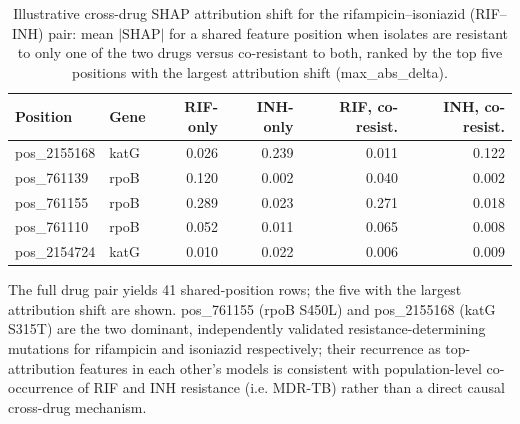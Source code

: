 \begin{table}[t]
\centering
\caption{Illustrative cross-drug SHAP attribution shift for the rifampicin--isoniazid (RIF--INH) pair: mean $|\mathrm{SHAP}|$ for a shared feature position when isolates are resistant to only one of the two drugs versus co-resistant to both, ranked by the top five positions with the largest attribution shift (max\_abs\_delta).}
\label{tab:crossdrug}
\small
\begin{tabular}{llrrrr}
\toprule
Position & Gene & RIF-only & INH-only & RIF, co-resist. & INH, co-resist. \\
\midrule
pos\_2155168 & katG & 0.026 & 0.239 & 0.011 & 0.122 \\
pos\_761139  & rpoB & 0.120 & 0.002 & 0.040 & 0.002 \\
pos\_761155  & rpoB & 0.289 & 0.023 & 0.271 & 0.018 \\
pos\_761110  & rpoB & 0.052 & 0.011 & 0.065 & 0.008 \\
pos\_2154724 & katG & 0.010 & 0.022 & 0.006 & 0.009 \\
\bottomrule
\end{tabular}

\vspace{4pt}
\footnotesize
The full drug pair yields 41 shared-position rows; the five with the largest attribution shift are shown. pos\_761155 (rpoB S450L) and pos\_2155168 (katG S315T) are the two dominant, independently validated resistance-determining mutations for rifampicin and isoniazid respectively; their recurrence as top-attribution features in each other's models is consistent with population-level co-occurrence of RIF and INH resistance (i.e. MDR-TB) rather than a direct causal cross-drug mechanism.
\end{table}
